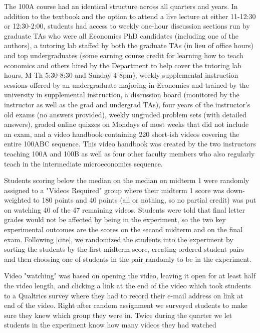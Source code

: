 \documentclass[12pt]{article}
\begin{document}
The 100A course had an identical structure across all quarters and years. In addition to the textbook and the option to attend a live lecture at either 11-12:30 or 12:30-2:00, students had access to weekly one-hour discussion sections run by graduate TAs who were all Economics PhD candidates (including one of the authors), a tutoring lab staffed by both the graduate TAs (in lieu of office hours) and top undergraduates (some earning course credit for learning how to teach economics and others hired by the Department to help cover the tutoring lab hours, M-Th 5:30-8:30 and Sunday 4-8pm), weekly supplemental instruction sessions offered by an undergraduate majoring in Economics and trained by the university in supplemental instruction, a discussion board (monitored by the instructor as well as the grad and undergrad TAs), four years of the instructor's old exams (no answers provided), weekly ungraded problem sets (with detailed answers), graded online quizzes on Mondays of most weeks that did not include an exam, and a video handbook containing 220 short-ish videos covering the entire 100ABC sequence. This video handbook was created by the two instructors teaching 100A and 100B as well as four other faculty members who also regularly teach in the intermediate microeconomics sequence.

Students scoring below the median on the median on midterm 1 were randomly assigned to a "Videos Required" group where their midterm 1 score was down-weighted to 180 points and 40 points (all or nothing, so no partial credit) was put on watching 40 of the 47 remaining videos. Students were told that final letter grades would not be affected by being in the experiment, so the two key experimental outcomes are the scores on the second midterm and on the final exam. Following [cite], we randomized the students into the experiment by sorting the students by the first midterm score, creating ordered student pairs and then choosing one of students in the pair randomly to be in the experiment.

Video "watching" was based on opening the video, leaving it open for at least half the video length, and clicking a link at the end of the video which took students to a Qualtrics survey where they had to record their e-mail address on link at end of the video. Right after random assignment we surveyed students to make sure they knew which group they were in. Twice during the quarter we let students in the experiment know how many videos they had watched
\end{document}
